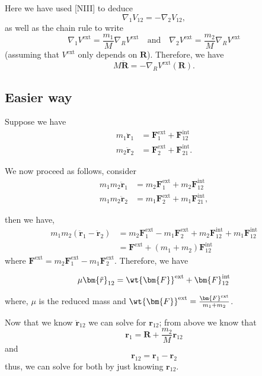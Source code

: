 \documentclass[12pt, a4paper]{article}
\begin{document}
Here we have used [NIII] to deduce 
\[\nabla_1 V_{12} = -\nabla_2 V_{12},\]
as well as the chain rule to write 
\[\nabla_1 V^{\text{ext}} = \frac{m_1}{M} \nabla_R V^{\text{ext}} \quad \text{and} \quad \nabla_2 V^{\text{ext}} = \frac{m_2}{M} \nabla_R V^{\text{ext}}\]
(assuming that \(V^{\text{ext}}\) only depends on \(\bm{R}\)). Therefore, we have 
\[M\bm{\ddot{R}}=  - \nabla_R V^{\text{ext}}(\bm{R}).\]

\subsection*{Easier way}

Suppose we have 
\[\begin{aligned}
    m_1 \bm{\ddot{r}}_1 &= \bm{F}_1^{\text{ext}}+\bm{F}_{12}^{\text{int}} \\
    m_2 \bm{\ddot{r}}_2 &= \bm{F}_2^{\text{ext}}+\bm{F}_{21}^{\text{int}}.
\end{aligned}\]

We now proceed as follows, consider 
\[\begin{aligned}
    m_1 m_2 \bm{\ddot{r}}_1 &= m_2\bm{F}_1^{\text{ext}}+m_2\bm{F}_{12}^{\text{int}} \\
    m_1 m_2 \bm{\ddot{r}}_2 &= m_1\bm{F}_2^{\text{ext}}+m_1\bm{F}_{21}^{\text{int}},
\end{aligned}\]

then we have,
\[\begin{aligned}
    m_1 m_2 (\bm{\ddot{r}}_1-\bm{\ddot{r}}_2) &= m_2\bm{F}_1^{\text{ext}}-m_1 \bm{F}_2^{\text{ext}}+ m_2\bm{F}_{12}^{\text{int}}+m_1\bm{F}_{12}^{\text{int}} \\
    &= \bm{F}^{\text{ext}}+(m_1+m_2)\bm{F}_{12}^{\text{int}}
\end{aligned}\]
where \(\bm{F}^{\text{ext}}=m_2\bm{F}_1^{\text{ext}}-m_1 \bm{F}_2^{\text{ext}}\). Therefore, we have

\[\begin{aligned}
    \mu \bm{\ddot{r}}_{12} = \wt{\bm{F}}^{\text{ext}}+\bm{F}_{12}^{\text{int}}
\end{aligned}\]

where, \(\mu\) is the reduced mass and \(\wt{\bm{F}}^{\text{ext}} = \frac{\bm{F}^{\text{ext}}}{m_1+m_2}\).

Now that we know \(\bm{\ddot{r}}_{12}\) we can solve for \(\bm{r}_{12}\); from above we know that 
\[\bm{r}_1 = \bm{R}+\frac{m_2}{M}\bm{r}_{12}\]
and 
\[\bm{r}_{12}=\bm{r}_1-\bm{r}_2\]
thus, we can solve for both by just knowing \(\bm{r}_{12}\).
\end{document}
